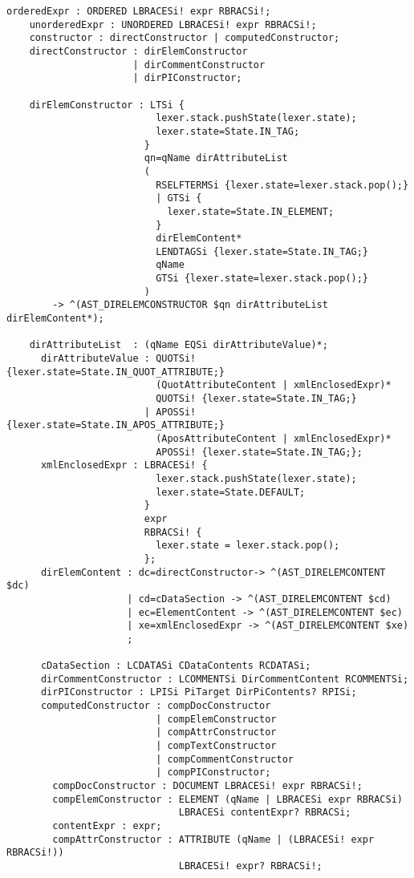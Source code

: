 \begin{Verbatim}[frame=none, fontsize=\footnotesize]
    orderedExpr : ORDERED LBRACESi! expr RBRACSi!;
    unorderedExpr : UNORDERED LBRACESi! expr RBRACSi!;  
    constructor : directConstructor | computedConstructor;  
    directConstructor : dirElemConstructor
                      | dirCommentConstructor
                      | dirPIConstructor;
                  
    dirElemConstructor : LTSi {
                          lexer.stack.pushState(lexer.state); 
                          lexer.state=State.IN_TAG;
                        }
                        qn=qName dirAttributeList
                        (
                          RSELFTERMSi {lexer.state=lexer.stack.pop();}
                          | GTSi {
                            lexer.state=State.IN_ELEMENT;
                          }
                          dirElemContent* 
                          LENDTAGSi {lexer.state=State.IN_TAG;}
                          qName 
                          GTSi {lexer.state=lexer.stack.pop();}
                        )
        -> ^(AST_DIRELEMCONSTRUCTOR $qn dirAttributeList dirElemContent*);

    dirAttributeList  : (qName EQSi dirAttributeValue)*; 
      dirAttributeValue : QUOTSi! {lexer.state=State.IN_QUOT_ATTRIBUTE;}
                          (QuotAttributeContent | xmlEnclosedExpr)* 
                          QUOTSi! {lexer.state=State.IN_TAG;}
                        | APOSSi! {lexer.state=State.IN_APOS_ATTRIBUTE;}
                          (AposAttributeContent | xmlEnclosedExpr)* 
                          APOSSi! {lexer.state=State.IN_TAG;}; 
      xmlEnclosedExpr : LBRACESi! {
                          lexer.stack.pushState(lexer.state); 
                          lexer.state=State.DEFAULT;
                        }
                        expr 
                        RBRACSi! {
                          lexer.state = lexer.stack.pop();
                        };
      dirElemContent : dc=directConstructor-> ^(AST_DIRELEMCONTENT $dc)
                     | cd=cDataSection -> ^(AST_DIRELEMCONTENT $cd)
                     | ec=ElementContent -> ^(AST_DIRELEMCONTENT $ec)
                     | xe=xmlEnclosedExpr -> ^(AST_DIRELEMCONTENT $xe)
                     ;

      cDataSection : LCDATASi CDataContents RCDATASi;        
      dirCommentConstructor : LCOMMENTSi DirCommentContent RCOMMENTSi;
      dirPIConstructor : LPISi PiTarget DirPiContents? RPISi;
      computedConstructor : compDocConstructor
                          | compElemConstructor
                          | compAttrConstructor
                          | compTextConstructor
                          | compCommentConstructor
                          | compPIConstructor; 
        compDocConstructor : DOCUMENT LBRACESi! expr RBRACSi!;
        compElemConstructor : ELEMENT (qName | LBRACESi expr RBRACSi) 
                              LBRACESi contentExpr? RBRACSi;
        contentExpr : expr;                                
        compAttrConstructor : ATTRIBUTE (qName | (LBRACESi! expr RBRACSi!)) 
                              LBRACESi! expr? RBRACSi!;                  
        

\end{Verbatim}
